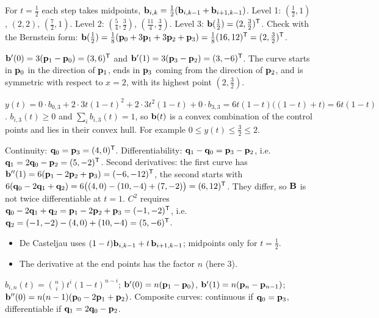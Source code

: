 \begin{solution}
 For $t=\frac12$ each step takes midpoints, $\mathbf{b}_{i,k}=\frac12(\mathbf{b}_{i,k-1}+\mathbf{b}_{i+1,k-1})$. Level 1: $(\frac12,1)$, $(2,2)$, $(\frac72,1)$. 
Level 2: $(\frac54,\frac32)$, $(\frac{11}4,\frac32)$. Level 3: $\mathbf{b}(\frac12)=(2,\frac32)^{\mathsf{T}}$. 
Check with the Bernstein form: $\mathbf{b}(\frac12)=\frac18(\mathbf{p}_0+3\mathbf{p}_1+3\mathbf{p}_2+\mathbf{p}_3)=\frac18(16,12)^{\mathsf{T}}=(2,\frac32)^{\mathsf{T}}$. 

 $\mathbf{b}'(0)=3(\mathbf{p}_1-\mathbf{p}_0)=(3,6)^{\mathsf{T}}$ and $\mathbf{b}'(1)=3(\mathbf{p}_3-\mathbf{p}_2)=(3,-6)^{\mathsf{T}}$. The curve starts in $\mathbf{p}_0$ in the direction of $\mathbf{p}_1$, ends in $\mathbf{p}_3$ coming from the direction of $\mathbf{p}_2$, and is symmetric with respect to $x=2$, with its highest point $(2,\frac32)$. 

 $y(t)=0\cdot b_{0,3}+2\cdot3t(1-t)^2+2\cdot3t^2(1-t)+0\cdot b_{3,3}=6t(1-t)\big((1-t)+t\big)=6t(1-t)$. 
$b_{i,3}(t)\ge0$ and $\sum_ib_{i,3}(t)=1$, so $\mathbf{b}(t)$ is a convex combination of the control points and lies in their convex hull. For example $0\le y(t)\le\frac32\le2$. 

 Continuity: $\mathbf{q}_0=\mathbf{p}_3=(4,0)^{\mathsf{T}}$. Differentiability: $\mathbf{q}_1-\mathbf{q}_0=\mathbf{p}_3-\mathbf{p}_2$, i.e.\ $\mathbf{q}_1=2\mathbf{q}_0-\mathbf{p}_2=(5,-2)^{\mathsf{T}}$. 
Second derivatives: the first curve has $\mathbf{b}''(1)=6(\mathbf{p}_1-2\mathbf{p}_2+\mathbf{p}_3)=(-6,-12)^{\mathsf{T}}$, the second starts with $6(\mathbf{q}_0-2\mathbf{q}_1+\mathbf{q}_2)=6\big((4,0)-(10,-4)+(7,-2)\big)=(6,12)^{\mathsf{T}}$. They differ, so $\mathbf{B}$ is not twice differentiable at $t=1$. 
$C^2$ requires $\mathbf{q}_0-2\mathbf{q}_1+\mathbf{q}_2=\mathbf{p}_1-2\mathbf{p}_2+\mathbf{p}_3=(-1,-2)^{\mathsf{T}}$, i.e.\ $\mathbf{q}_2=(-1,-2)-(4,0)+(10,-4)=(5,-6)^{\mathsf{T}}$. 

\begin{trap}
\begin{itemize}
\item De Casteljau uses $(1-t)\mathbf{b}_{i,k-1}+t\,\mathbf{b}_{i+1,k-1}$; midpoints only for $t=\frac12$.
\item The derivative at the end points has the factor $n$ (here $3$).
\end{itemize}
\end{trap}
\begin{heart}
$b_{i,n}(t)=\binom ni t^i(1-t)^{n-i}$; $\mathbf{b}'(0)=n(\mathbf{p}_1-\mathbf{p}_0)$, $\mathbf{b}'(1)=n(\mathbf{p}_n-\mathbf{p}_{n-1})$; $\mathbf{b}''(0)=n(n-1)(\mathbf{p}_0-2\mathbf{p}_1+\mathbf{p}_2)$. Composite curves: continuous if $\mathbf{q}_0=\mathbf{p}_3$, differentiable if $\mathbf{q}_1=2\mathbf{q}_0-\mathbf{p}_2$.
\end{heart}
\end{solution}


